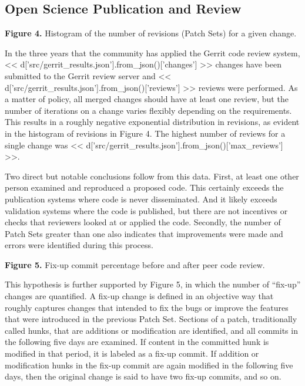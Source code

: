 \documentclass{frontiersENG} %
\begin{document}
\subsection{Open Science Publication and Review}

\textbf{Figure 4. }{Histogram of the number of revisions (Patch Sets) for a
given change.}\label{fig:04}

In the three years that the community has applied the Gerrit code review
system, << d['src/gerrit_results.json'].from_json()['changes'] >> changes have
been submitted to the Gerrit review server and
<< d['src/gerrit_results.json'].from_json()['reviews'] >> reviews were performed.
As a matter of policy, all merged changes should have at least one review,
but the number of iterations on a change varies flexibly depending on the
requirements. This results in a roughly negative exponential distribution in
revisions, as evident in the histogram of revisions in
Figure 4.  The highest number of reviews
for a single change was
<< d['src/gerrit_results.json'].from_json()['max_reviews'] >>.

Two direct but notable conclusions follow from this data. First, at least one
other person examined and reproduced a proposed code.  This certainly exceeds
the publication systems where code is never disseminated. And it likely exceeds
validation systems where the code is published, but there are not incentives or
checks that reviewers looked at or applied the code.  Secondly, the number of
Patch Sets greater than one also indicates that improvements were made and
errors were identified during this process.

\textbf{Figure 5. }{Fix-up commit percentage before and after peer code review.}
\label{fig:05}

This hypothesis is further supported by Figure 5, in which the number of
``fix-up'' changes are quantified. A fix-up change is defined in an objective
way that roughly captures changes that intended to fix the bugs or improve the
features that were introduced in the previous Patch Set.  Sections of a patch,
traditionally called hunks, that are additions or modification are identified,
and all commits in the following five days are examined.  If content in the
committed hunk is modified in that period, it is labeled as a fix-up commit.
If addition or modification hunks in the fix-up commit are again modified in
the following five days, then the original change is said to have two fix-up
commits, and so on.
\end{document}
